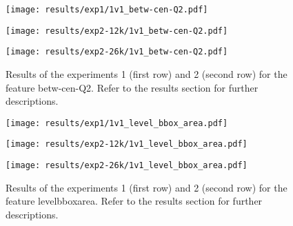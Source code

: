 \begin{figure}[h!]
	\centering
	\begin{minipage}{0.4\linewidth}
		\texttt{[image: results/exp1/1v1\_betw-cen-Q2.pdf]}
	\end{minipage}
	
	\begin{minipage}{0.4\linewidth}
		\texttt{[image: results/exp2-12k/1v1\_betw-cen-Q2.pdf]}
	\end{minipage}
	\begin{minipage}{0.4\linewidth}
		\texttt{[image: results/exp2-26k/1v1\_betw-cen-Q2.pdf]}
	\end{minipage}
	
	\caption[ Results: Feature betw-cen-Q2]{ Results of the experiments 1 (first row) and 2 (second row) for the feature betw-cen-Q2. Refer to the results section for further descriptions. }
	\label{fig:appendix_betw-cen-Q2}
\end{figure}
\newpage 


\begin{figure}[h!]
	\centering
	\begin{minipage}{0.4\linewidth}
		\texttt{[image: results/exp1/1v1\_level\_bbox\_area.pdf]}
	\end{minipage}
	
	\begin{minipage}{0.4\linewidth}
		\texttt{[image: results/exp2-12k/1v1\_level\_bbox\_area.pdf]}
	\end{minipage}
	\begin{minipage}{0.4\linewidth}
		\texttt{[image: results/exp2-26k/1v1\_level\_bbox\_area.pdf]}
	\end{minipage}
	
	\caption[ Results: Feature level\textunderscore bbox\textunderscore area]{ Results of the experiments 1 (first row) and 2 (second row) for the feature level\textunderscore bbox\textunderscore area. Refer to the results section for further descriptions. }
	\label{fig:appendix_level_bbox_area}
\end{figure}

